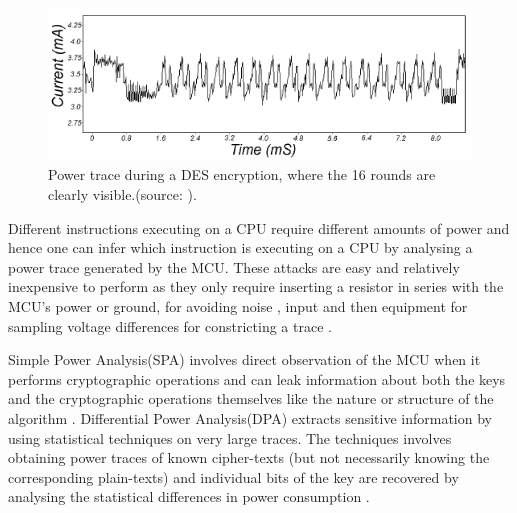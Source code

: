 	\begin{figure}
		\center
		\includegraphics[scale=0.7]{img/power_des.png}
		\caption{\footnotesize Power trace during a DES encryption, where the 16 rounds are clearly visible.(source: \protect\citep{kocher:DPA}).}
		\label{fig:des_power}		
	\end{figure}

	Different instructions executing on a CPU require different amounts of power \citep{website:riscure} \citep{kocher:DPA} and hence one can infer which instruction is executing on a CPU by analysing a power trace generated by the MCU. These attacks are easy and relatively inexpensive to perform as they only require inserting a resistor in series with the MCU's power or ground, for avoiding noise \citep{sergei:thesis}, input and then equipment for sampling voltage differences for constricting a trace \citep{kocher:DPA}. 

Simple Power Analysis(SPA) involves direct observation of the MCU when it performs cryptographic operations and can leak information about both the keys and the cryptographic operations themselves like the nature or structure of the algorithm \citep{kocher:DPA} \citep{anderson:tamper_resistance}. Differential Power Analysis(DPA) extracts sensitive information by using statistical techniques on very large traces. The techniques involves obtaining power traces of known cipher-texts (but not necessarily knowing the corresponding plain-texts) and individual bits of the key are recovered by analysing the statistical differences in power consumption \citep{kocher:DPA} \citep{anderson:tamper_resistance}.

